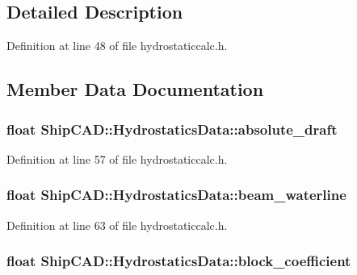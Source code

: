 \subsection{Detailed Description}


Definition at line 48 of file hydrostaticcalc.\-h.



\subsection{Member Data Documentation}
\hypertarget{structShipCAD_1_1HydrostaticsData_a6857139c04212164c5557cc816f80345}{
\subsubsection[{absolute\-\_\-draft}]{\setlength{\rightskip}{0pt plus 5cm}float Ship\-C\-A\-D\-::\-Hydrostatics\-Data\-::absolute\-\_\-draft}}\label{structShipCAD_1_1HydrostaticsData_a6857139c04212164c5557cc816f80345}


Definition at line 57 of file hydrostaticcalc.\-h.

\hypertarget{structShipCAD_1_1HydrostaticsData_ab79755f5814572be0dfd3ae3ba214fca}{
\subsubsection[{beam\-\_\-waterline}]{\setlength{\rightskip}{0pt plus 5cm}float Ship\-C\-A\-D\-::\-Hydrostatics\-Data\-::beam\-\_\-waterline}}\label{structShipCAD_1_1HydrostaticsData_ab79755f5814572be0dfd3ae3ba214fca}


Definition at line 63 of file hydrostaticcalc.\-h.

\hypertarget{structShipCAD_1_1HydrostaticsData_ac59c717b9869f0aacca4305fd81d4882}{
\subsubsection[{block\-\_\-coefficient}]{\setlength{\rightskip}{0pt plus 5cm}float Ship\-C\-A\-D\-::\-Hydrostatics\-Data\-::block\-\_\-coefficient}}\label{structShipCAD_1_1HydrostaticsData_ac59c717b9869f0aacca4305fd81d4882}


